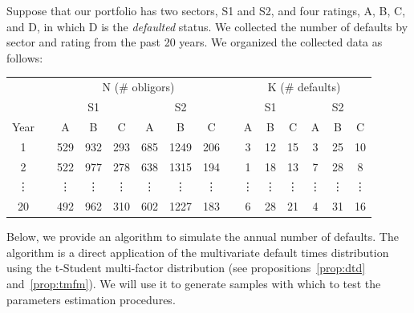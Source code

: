 \documentclass[11pt,fleqn]{book} %
\begin{document}
\begin{example}
	Suppose that our portfolio has two sectors, S1 and S2, and four ratings, 
	A, B, C, and D, in which D is the \emph{defaulted} status. We collected 
	the number of defaults by sector and rating from the past 20 years. We 
	organized the collected data as follows:

	\centering
	\begin{tabular}{cc|c|c|c||c|c|c|  c  |c|c|c||c|c|c|}
		\cline{3-8} \cline{10-15}
		& & \multicolumn{6}{|c|}{N (\# obligors)} & & \multicolumn{6}{|c|}{K (\# defaults)} \\
		\cline{3-8} \cline{10-15}
		& & \multicolumn{3}{|c||}{S1} & \multicolumn{3}{|c|}{S2} & & \multicolumn{3}{|c||}{S1} & \multicolumn{3}{|c|}{S2} \\
		\cline{1-1} \cline{3-8} \cline{10-15}
		\multicolumn{1}{|c|}{Year} & & A & B & C & A & B & C & & A & B & C & A & B & C \\
		\cline{1-1} \cline{3-8} \cline{10-15}
		\multicolumn{1}{|c|}{1} & & 529 & 932 & 293 & 685 & 1249 & 206 & & 3 & 12 & 15 & 3 & 25 & 10 \\
		\cline{1-1} \cline{3-8} \cline{10-15}
		\multicolumn{1}{|c|}{2} & & 522 & 977 & 278 & 638 & 1315 & 194 & & 1 & 18 & 13 & 7 & 28 & 8 \\
		\cline{1-1} \cline{3-8} \cline{10-15}
		\multicolumn{1}{|c|}{\vdots} & & \vdots & \vdots & \vdots & \vdots & \vdots & \vdots & & \vdots & \vdots & \vdots & \vdots & \vdots & \vdots \\
		\cline{1-1} \cline{3-8} \cline{10-15}
		\multicolumn{1}{|c|}{20} & & 492 & 962 & 310 & 602 & 1227 & 183 & & 6 & 28 & 21 & 4 & 31 & 16 \\
		\cline{1-1} \cline{3-8} \cline{10-15}
	\end{tabular}
\end{example}

Below, we provide an algorithm to simulate the annual number of defaults. The 
algorithm is a direct application of the multivariate default times distribution
using the t-Student multi-factor distribution (see propositions~\ref{prop:dtd} 
and~\ref{prop:tmfm}). We will use it to generate samples with which to 
test the parameters estimation procedures. 
\end{document}
